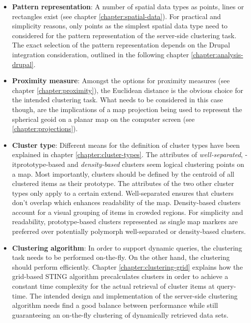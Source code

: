 \begin{itemize}

\item \textbf{Pattern representation}: A number of spatial data types as points, lines or rectangles exist (see chapter \ref{chapter:spatial-data}). For practical and simplicity reasons, only points as the simplest spatial data type need to considered for the pattern representation of the server-side clustering task. The exact selection of the pattern representation depends on the Drupal integration consideration, outlined in the following chapter \ref{chapter:analysis-drupal}.

\item \textbf{Proximity measure}: Amongst the options for proximity measures (see chapter \ref{chapter:proximity}), the Euclidean distance is the obvious choice for the intended clustering task. What needs to be considered in this case though, are the implications of a map projection being used to represent the spherical geoid on a planar map on the computer screen (see \ref{chapter:projections}).

\item \textbf{Cluster type}: Different means for the definition of cluster types have been explained in chapter \ref{chapter:cluster-types}. The attributes of \textit{well-separated}, \text-it{prototype-based} and \textit{density-based} clusters seem logical clustering points on a map. Most importantly, clusters should be defined by the centroid of all clustered items as their prototype. The attributes of the two other cluster types only apply to a certain extend. Well-separated ensures that clusters don't overlap which enhances readability of the map. Density-based clusters account for a visual grouping of items in crowded regions. For simplicity and readability, prototype-based clusters represented as single map markers are preferred over potentially polymorph well-separated or density-based clusters.

\item \textbf{Clustering algorithm}: In order to support dynamic queries, the clustering task needs to be performed on-the-fly. On the other hand, the clustering should perform efficiently. Chapter \ref{chapter:clustering-grid} explains how the grid-based STING algorithm precalculates clusters in order to achieve a constant time complexity for the actual retrieval of cluster items at query-time. The intended design and implementation of the server-side clustering algorithm needs find a good balance between performance while still guaranteeing an on-the-fly clustering of dynamically retrieved data sets.

\end{itemize}


